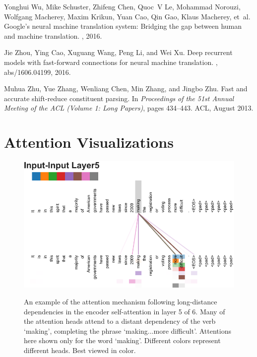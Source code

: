 \documentclass{article}
\begin{document}
\begin{thebibliography}{10}
  Yonghui Wu, Mike Schuster, Zhifeng Chen, Quoc~V Le, Mohammad Norouzi, Wolfgang
  Macherey, Maxim Krikun, Yuan Cao, Qin Gao, Klaus Macherey, et~al.
  \newblock Google's neural machine translation system: Bridging the gap between
  human and machine translation.
  , 2016.

  Jie Zhou, Ying Cao, Xuguang Wang, Peng Li, and Wei Xu.
  \newblock Deep recurrent models with fast-forward connections for neural
  machine translation.
  , abs/1606.04199, 2016.

  Muhua Zhu, Yue Zhang, Wenliang Chen, Min Zhang, and Jingbo Zhu.
  \newblock Fast and accurate shift-reduce constituent parsing.
  \newblock In {\em Proceedings of the 51st Annual Meeting of the ACL (Volume 1:
      Long Papers)}, pages 434--443. ACL, August 2013.

\end{thebibliography}
\pagebreak
\section*{Attention Visualizations}\label{sec:viz-att}
\begin{figure}[h]
{\includegraphics[width=\textwidth, trim=0 0 0 36, clip]{./vis/making_more_difficult5_new.pdf}}
\caption{An example of the attention mechanism following long-distance dependencies in the encoder self-attention in layer 5 of 6. Many of the attention heads attend to a distant dependency of the verb `making', completing the phrase `making...more difficult'.  Attentions here shown only for the word `making'. Different colors represent different heads. Best viewed in color.}
\end{figure}
\end{document}
